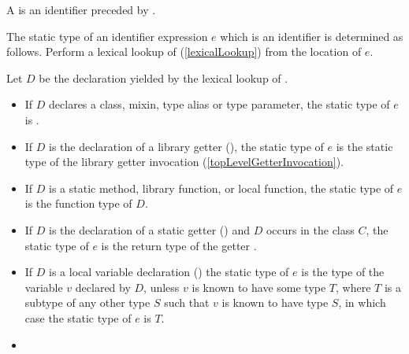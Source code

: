 \documentclass[makeidx]{article}
\begin{document}
{

\LMHash{}%
A  is an identifier preceded by
.

\LMHash{}%
The static type of an identifier expression $e$ which is an identifier \id{}
is determined as follows.
Perform a lexical lookup of \id{}
(\ref{lexicalLookup})
from the location of $e$.

\LMHash{}%
Let $D$ be the declaration yielded by the lexical lookup of \id.

\begin{itemize}
\item
  If $D$ declares a class, mixin, type alias or type parameter,
  the static type of $e$ is .
\item
  If $D$ is the declaration of a library getter
  (),
  the static type of $e$ is the static type of the
  library getter invocation \id{}
  (\ref{topLevelGetterInvocation}).
\item
  If $D$ is a static method, library function, or local function,
  the static type of $e$ is the function type of $D$.

\item
  If $D$ is the declaration of a static getter
  ()
  and $D$ occurs in the class $C$,
  the static type of $e$ is the return type of the getter
  .
\item
  If $D$ is a local variable declaration
  ()
  the static type of $e$ is the type of the variable $v$ declared by $D$,
  unless $v$ is known to have some type $T$,
  where $T$ is a subtype of any other type $S$
  such that $v$ is known to have type $S$,
  in which case the static type of $e$ is $T$.
\item
\end{itemize}
\vspace{-1ex}
\EndCase

}
\end{document}
